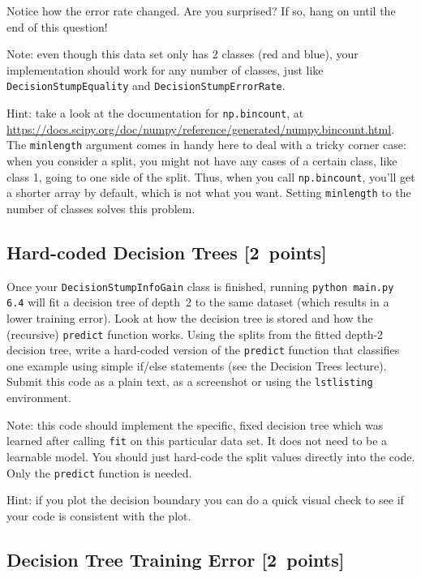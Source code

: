 \documentclass{article}
\newcommand{\blu}[1]{{\textcolor{blu}{#1}}}
\let\ask\blu
\newcommand\pts[1]{\textcolor{pointscolour}{[#1~points]}}
\begin{document}
  Notice how the error rate changed. Are you surprised? If so, hang on until the end of this question!

  Note: even though this data set only has 2 classes (red and blue), your implementation should work
  for any number of classes, just like \texttt{DecisionStumpEquality} and \texttt{DecisionStumpErrorRate}.

  Hint: take a look at the documentation for \texttt{np.bincount}, at \\
  \url{https://docs.scipy.org/doc/numpy/reference/generated/numpy.bincount.html}.
  The \texttt{minlength} argument comes in handy here to deal with a tricky corner case:
  when you consider a split, you might not have any cases of a certain class, like class 1,
  going to one side of the split. Thus, when you call \texttt{np.bincount}, you'll get
  a shorter array by default, which is not what you want. Setting \texttt{minlength} to the
  number of classes solves this problem.


  \subsection{Hard-coded Decision Trees \pts{2}}

  Once your \texttt{DecisionStumpInfoGain} class is finished, running \texttt{python main.py 6.4} will fit
  a decision tree of depth~2 to the same dataset (which results in a lower training error).
  Look at how the decision tree is stored and how the (recursive) \texttt{predict} function works.
  \ask{Using the splits from the fitted depth-2 decision tree, write a hard-coded version of the \texttt{predict}
  function that classifies one example using simple if/else statements
  (see the Decision Trees lecture). Submit this code as a plain text, as a screenshot or using the \texttt{lstlisting} environment.}

  Note: this code should implement the specific, fixed decision tree
  which was learned after calling \texttt{fit} on this particular data set. It does not need to be a learnable model.
  You should just hard-code the split values directly into the code.
  Only the \texttt{predict} function is needed.

  Hint: if you plot the decision boundary you can do a quick visual check to see if your code is consistent with the plot.



  \subsection{Decision Tree Training Error \pts{2}}
\end{document}
